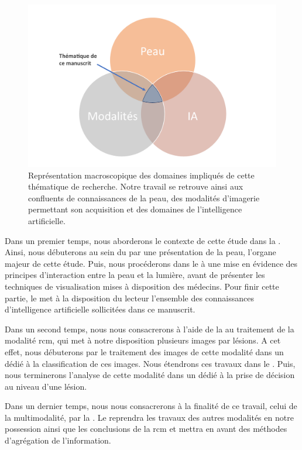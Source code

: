 \begin{figure}[H]
    \centering
    \includegraphics[width=0.8\linewidth]{contents/i_introduction/resources/scheme_our_work.pdf}
    \caption{Représentation macroscopique des domaines impliqués de cette thématique de recherche. Notre travail se retrouve ainsi aux confluents de connaissances de la peau, des modalités d'imagerie permettant son acquisition et des domaines de l'intelligence artificielle.}
    \label{fig:scheme_our_work}
\end{figure}\par

Dans un premier temps, nous aborderons le contexte de cette étude dans la . Ainsi, nous débuterons au sein du  par une présentation de la peau, l'organe majeur de cette étude. Puis, nous procéderons dans le  à une mise en évidence des principes d'interaction entre la peau et la lumière, avant de présenter les techniques de visualisation mises à disposition des médecins. Pour finir cette partie, le  met à la disposition du lecteur l'ensemble des connaissances d'intelligence artificielle sollicitées dans ce manuscrit.\par

Dans un second temps, nous nous consacrerons à l'aide de la  au traitement de la modalité \gls{rcm}, qui met à notre disposition plusieurs images par lésions. A cet effet, nous débuterons par le traitement des images de cette modalité dans un  dédié à la classification de ces images. Nous étendrons ces travaux dans le . Puis, nous terminerons l'analyse de cette modalité dans un  dédié à la prise de décision au niveau d'une lésion.\par

Dans un dernier temps, nous nous consacrerons à la finalité de ce travail, celui de la multimodalité, par la . Le  reprendra les travaux des autres modalités en notre possession ainsi que les conclusions de la \gls{rcm} et mettra en avant des méthodes d'agrégation de l'information.\par


